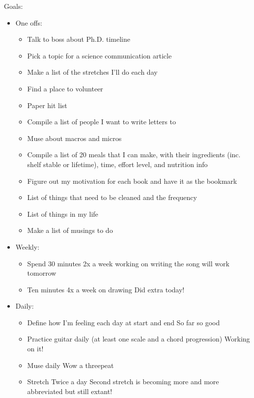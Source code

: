 \documentclass[12pt]{article}[titlepage]
\renewcommand{\,}{\textsuperscript{,}}
\begin{document}
Goals:  
\begin{itemize}  
\item One offs:  
\begin{itemize}  
\item Talk to boss about Ph.D. timeline  
\item Pick a topic for a science communication article  
\item Make a list of the stretches I'll do each day  
\item Find a place to volunteer  
\item Paper hit list  
\item Compile a list of people I want to write letters to  
\item Muse about macros and micros  
\item Compile a list of 20 meals that I can make, with their ingredients (inc. shelf stable or lifetime), time, effort level, and nutrition info  
\item Figure out my motivation for each book and have it as the bookmark  
\item List of things that need to be cleaned and the frequency  
\item List of things in my life  
\item Make a list of musings to do  
\end{itemize}  
\item Weekly:  
\begin{itemize}  
\item Spend 30 minutes 2x a week working on writing the song \-\> will work tomorrow  
\item Ten minutes 4x a week on drawing \-\> Did extra today!  
\end{itemize}  
\item Daily:  
\begin{itemize}  
\item Define how I'm feeling each day at start and end \-\> So far so good  
\item Practice guitar daily (at least one scale and a chord progression) \-\> Working on it!  
\item Muse daily \-\> Wow a threepeat  
\item Stretch Twice a day \-\> Second stretch is becoming more and more abbreviated but still extant!  
\end{itemize}  
\end{itemize}
\end{document}
